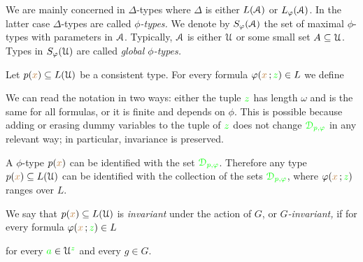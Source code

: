 We are mainly concerned in $\Delta$-types where $\Delta$ is either $L(\EuScript A)$ or $L_\varphi(\EuScript A)$.
In the latter case $\Delta$-types are called \emph{$\phi$-types.}
We denote by \emph{$S_\varphi(\EuScript A)$\/} the set of maximal $\phi$-types with parameters in $\EuScript A$.
Typically, $\EuScript A$ is either $\EuScript U$ or some small set $A\subseteq\EuScript U$.
Types in \emph{$S_{\varphi}(\EuScript U)$\/} are called \emph{global $\phi$-types.}
   

% 

Let $p({\color{brown} x})\subseteq L(\EuScript U)$ be a consistent type.
For every formula $\varphi({\color{brown} x}\,;{\color{green} z})\in L$ we define


We can read the notation in two ways: either the tuple ${\color{green} z}$ has length $\omega$ and is the same for all formulas, or it is finite and depends on $\phi$.
This is possible because adding or erasing dummy variables to the tuple of ${\color{green} z}$ does not change ${\color{green}\EuScript D_{p,\varphi}}$ in any relevant way; in particular, invariance is preserved.

A $\phi$-type $p({\color{brown} x})$ can be identified with the set ${\color{green}\EuScript D_{p,\varphi}}$.
Therefore any type $p({\color{brown} x})\subseteq L(\EuScript U)$ can be identified with the collection of the sets ${\color{green}\EuScript D_{p,\varphi}}$, where $\varphi({\color{brown} x}\,;{\color{green} z})$ ranges over $L$.

We say that $p({\color{brown} x})\subseteq L(\EuScript U)$ is \emph{invariant\/} under the action of $G$, or \emph{$G$-invariant,} if for every formula $\varphi({\color{brown} x}\,;{\color{green} z})\in L$ 

\hfill for every ${\color{green} a}\in\EuScript U^{\color{green} z}$ and every $g\in G$.


